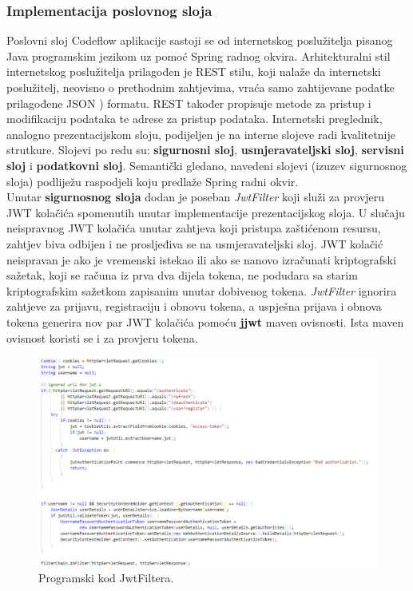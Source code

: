 \documentclass[times, utf8, zavrsni]{fer}
\begin{document}
	 		\subsubsection{Implementacija poslovnog sloja}
	 		Poslovni sloj Codeflow aplikacije sastoji se od internetskog poslužitelja pisanog Java programskim jezikom uz pomoć Spring radnog okvira. Arhitekturalni stil internetskog poslužitelja prilagođen je REST  stilu, koji nalaže da internetski poslužitelj, neovisno o prethodnim zahtjevima, vraća samo zahtijevane podatke prilagođene JSON ) formatu. REST također propisuje metode za pristup i modifikaciju podataka te adrese za pristup podataka. Internetski preglednik, analogno prezentacijskom sloju, podijeljen je na interne slojeve radi kvalitetnije strutkure. Slojevi po redu su: \textbf{sigurnosni sloj}, \textbf{usmjeravateljski sloj}, \textbf{servisni sloj} i \textbf{podatkovni sloj}. Semantički gledano, navedeni slojevi (izuzev sigurnosnog sloja) podliježu raspodjeli koju predlaže Spring radni okvir.\\
	 		Unutar \textbf{sigurnosnog sloja} dodan je poseban \textit{JwtFilter} koji služi za provjeru JWT kolačića spomenutih unutar implementacije prezentacijskog sloja. U slučaju neispravnog JWT kolačića unutar zahtjeva koji pristupa zaštićenom resursu, zahtjev biva odbijen i ne prosljeđiva se na usmjeravateljski sloj. JWT kolačić neispravan je ako je vremenski istekao ili ako se nanovo izračunati kriptografski sažetak, koji se računa  iz prva dva dijela tokena, ne podudara sa starim kriptografskim sažetkom zapisanim unutar dobivenog tokena. \textit{JwtFilter} ignorira zahtjeve za prijavu, registraciju i obnovu tokena, a uspješna prijava i obnova tokena generira nov par JWT kolačića pomoću \textbf{jjwt} maven ovisnosti. Ista maven ovisnost koristi se i za provjeru tokena.
	 		\begin{figure}[H]
	 			\centering
	 			\includegraphics[width=\linewidth]{pictures/prikazi/JwtFilter.png}
	 			\caption{Programski kod JwtFiltera.}
	 			\label{fig:jwtfilter}
	 		\end{figure}
 		
\end{document}
